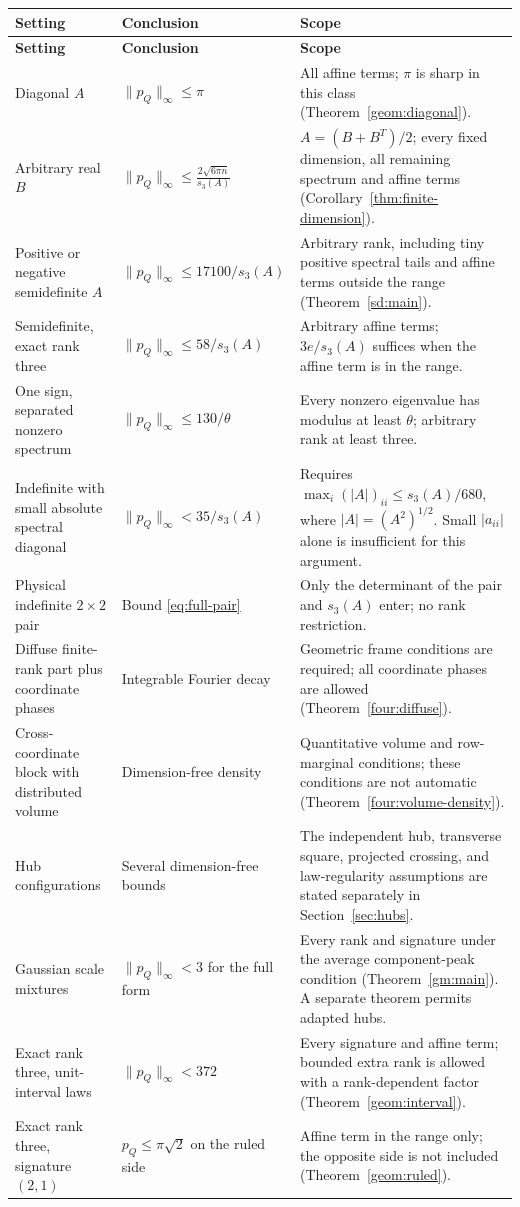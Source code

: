 \documentclass[11pt]{article}
\theoremstyle{definition}
\theoremstyle{remark}
\begin{document}
\begin{longtable}{@{}p{}p{}p{}@{}}
\toprule
\textbf{Setting} & \textbf{Conclusion} & \textbf{Scope}\tabularnewline
\midrule
\endfirsthead
\toprule
\textbf{Setting} & \textbf{Conclusion} & \textbf{Scope}\tabularnewline
\midrule
\endhead
Diagonal $A$ & $\|p_Q\|_\infty\le\pi$ & All affine terms; $\pi$ is sharp in this class (Theorem~\ref{geom:diagonal}).\tabularnewline
Arbitrary real $B$ & $\|p_Q\|_\infty\le\frac{2\sqrt{6\pi n}}{s_3(A)}$ & $A=(B+B^T)/2$; every fixed dimension, all remaining spectrum and affine terms (Corollary~\ref{thm:finite-dimension}).\tabularnewline
Positive or negative semidefinite $A$ & $\|p_Q\|_\infty\le17100/s_3(A)$ & Arbitrary rank, including tiny positive spectral tails and affine terms outside the range (Theorem~\ref{sd:main}).\tabularnewline
Semidefinite, exact rank three & $\|p_Q\|_\infty\le58/s_3(A)$ & Arbitrary affine terms; $3e/s_3(A)$ suffices when the affine term is in the range.\tabularnewline
One sign, separated nonzero spectrum & $\|p_Q\|_\infty\le130/\theta$ & Every nonzero eigenvalue has modulus at least $\theta$; arbitrary rank at least three.\tabularnewline
Indefinite with small absolute spectral diagonal & $\|p_Q\|_\infty<35/s_3(A)$ & Requires $\max_i(|A|)_{ii}\le s_3(A)/680$, where $|A|=(A^2)^{1/2}$. Small $|a_{ii}|$ alone is insufficient for this argument.\tabularnewline
Physical indefinite $2\times2$ pair & Bound \eqref{eq:full-pair} & Only the determinant of the pair and $s_3(A)$ enter; no rank restriction.\tabularnewline
Diffuse finite-rank part plus coordinate phases & Integrable Fourier decay & Geometric frame conditions are required; all coordinate phases are allowed (Theorem~\ref{four:diffuse}).\tabularnewline
Cross-coordinate block with distributed volume & Dimension-free density & Quantitative volume and row-marginal conditions; these conditions are not automatic (Theorem~\ref{four:volume-density}).\tabularnewline
Hub configurations & Several dimension-free bounds & The independent hub, transverse square, projected crossing, and law-regularity assumptions are stated separately in Section~\ref{sec:hubs}.\tabularnewline
Gaussian scale mixtures & $\|p_Q\|_\infty<3$ for the full form & Every rank and signature under the average component-peak condition (Theorem~\ref{gm:main}). A separate theorem permits adapted hubs.\tabularnewline
Exact rank three, unit-interval laws & $\|p_Q\|_\infty<372$ & Every signature and affine term; bounded extra rank is allowed with a rank-dependent factor (Theorem~\ref{geom:interval}).\tabularnewline
Exact rank three, signature $(2,1)$ & $p_Q\le\pi\sqrt2$ on the ruled side & Affine term in the range only; the opposite side is not included (Theorem~\ref{geom:ruled}).\tabularnewline
\bottomrule
\end{longtable}
\end{document}
